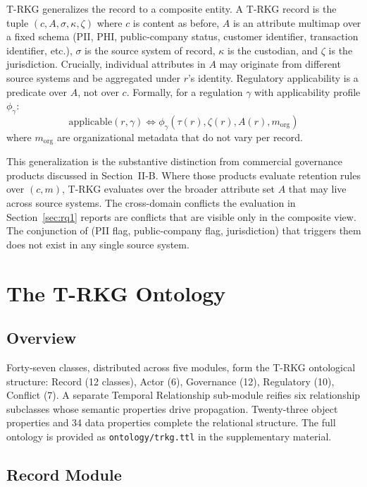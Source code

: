 \documentclass{ieeeaccess}
\begin{document}
T-RKG generalizes the record to a composite entity. A T-RKG record is the tuple $(c, A, \sigma, \kappa, \zeta)$ where $c$ is content as before, $A$ is an attribute multimap over a fixed schema (PII, PHI, public-company status, customer identifier, transaction identifier, etc.), $\sigma$ is the source system of record, $\kappa$ is the custodian, and $\zeta$ is the jurisdiction. Crucially, individual attributes in $A$ may originate from different source systems and be aggregated under $r$'s identity. Regulatory applicability is a predicate over $A$, not over $c$. Formally, for a regulation $\gamma$ with applicability profile $\phi_\gamma$:
\begin{equation}
    \mathrm{applicable}(r, \gamma) \iff \phi_\gamma(\tau(r), \zeta(r), A(r), m_{\mathrm{org}})
\end{equation}
where $m_{\mathrm{org}}$ are organizational metadata that do not vary per record.

This generalization is the substantive distinction from commercial governance products discussed in Section~II-B. Where those products evaluate retention rules over $(c, m)$, T-RKG evaluates over the broader attribute set $A$ that may live across source systems. The cross-domain conflicts the evaluation in Section~\ref{sec:rq1} reports are conflicts that are visible only in the composite view. The conjunction of (PII flag, public-company flag, jurisdiction) that triggers them does not exist in any single source system.

\section{The T-RKG Ontology}

\subsection{Overview}

Forty-seven classes, distributed across five modules, form the T-RKG ontological structure: Record (12 classes), Actor (6), Governance (12), Regulatory (10), Conflict (7). A separate Temporal Relationship sub-module reifies six relationship subclasses whose semantic properties drive propagation. Twenty-three object properties and 34 data properties complete the relational structure. The full ontology is provided as \texttt{ontology/trkg.ttl} in the supplementary material.

\subsection{Record Module}
\end{document}

